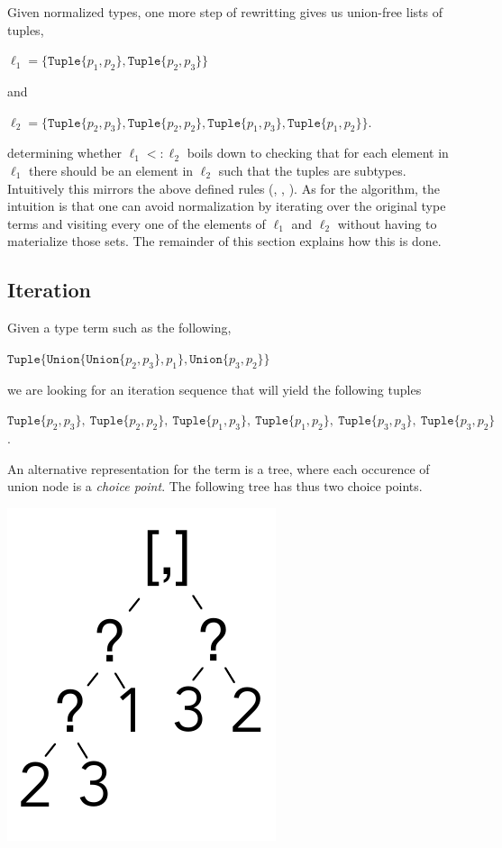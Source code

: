 \documentclass[a4paper,english]{lipics-v2019}
\newcommand{\xt}[1]{\texttt{#1}}
\newcommand{\union}[2]{\xt{Union\{}#1,#2\xt{\}}}
\newcommand{\tuple}[1]{\xt{Tuple\{}#1\xt{\}}}
\begin{document}
\noindent
Given normalized types, one more step of rewritting gives us union-free
lists of tuples,

\medskip
$\ell_1 = \{  \tuple{p_1,p_2}, \tuple{p_2,p_3}  \}$
\medskip

\noindent and

\medskip
$\ell_2 = \{  \tuple{p_2,p_3}, \tuple{p_2,p_2}, \tuple{p_1,p_3}, 
          \tuple{p_1,p_2} \}$.
\medskip

\noindent determining whether $\ell_1 <: \ell_2$ boils down to checking that
for each element in $\ell_1$ there should be an element in $\ell_2$ such
that the tuples are subtypes. Intuitively this mirrors the above defined
rules ({\sc [allexist]}, {\sc [existL/R]}, {\sc [tuple]}). As for the
algorithm, the intuition is that one can avoid normalization by iterating
over the original type terms and visiting every one of the elements of
$\ell_1$ and $\ell_2$ without having to materialize those sets. The
remainder of this section explains how this is done.

\subsection{Iteration}

Given a type term such as the following,

\medskip
$\tuple{ \union{ \union{p_2}{p_3} }{p_1}, \union{p_3}{p_2}}$
\medskip

\noindent
we are looking for an iteration sequence that will yield the following tuples

\medskip
\noindent $\tuple{p_2,p_3}, ~ \tuple{p_2,p_2}, ~ \tuple{p_1,p_3}, ~ \tuple{p_1,p_2}, ~
  \tuple{p_3,p_3}, ~ \tuple{p_3,p_2}$.
\medskip\vspace{-3mm}

\noindent
An alternative representation for the term is a tree, where each occurence
of union node is a \emph{choice point}. The following tree has thus two
choice points.

\includegraphics[scale=.25]{figures/tree1.pdf}
\end{document}
